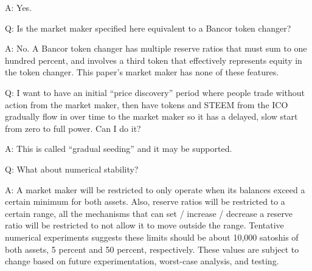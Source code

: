 \documentclass{article}
\begin{document}
A:  Yes.

Q:  Is the market maker specified here equivalent to a Bancor token changer?

A:  No.  A Bancor token changer has multiple reserve ratios that must sum to
one hundred percent, and involves a third token that effectively represents
equity in the token changer.  This paper's market maker has none of these
features.

Q:  I want to have an initial ``price discovery'' period where people trade
without action from the market maker, then have tokens and STEEM from
the ICO gradually flow in over time to the market maker so it has a delayed,
slow start from zero to full power.  Can I do it?

A:  This is called ``gradual seeding'' and it may be supported.

Q:  What about numerical stability?

A:  A market maker will be restricted to only operate when its
balances exceed a certain minimum for both assets.  Also, reserve
ratios will be restricted to a certain range, all the mechanisms
that can set / increase / decrease a reserve ratio will be restricted
to not allow it to move outside the range.  Tentative numerical
experiments suggests these limits should be about 10,000 satoshis
of both assets, 5 percent and 50 percent, respectively.  These
values are subject to change based on future experimentation,
worst-case analysis, and testing.
\end{document}
